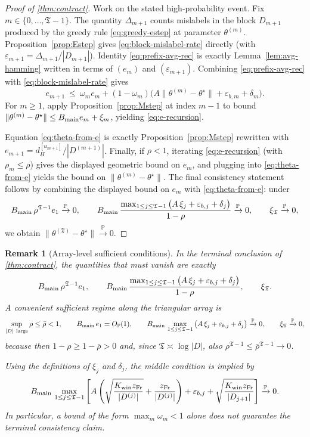 \documentclass{statsoc}
\newtheorem{remark}[remark]{Remark}
\newcommand{\1}{\mathbbm{1}}
\newcommand{\Tmax}{\mathfrak{T}}
\begin{document}
\begin{proof}[Proof of \cref{thm:contract}]
Work on the stated high-probability event. Fix $m\in\{0,\dots,\Tmax-1\}$. The quantity $\Delta_{m+1}$ counts mislabels in the block $D_{m+1}$ produced by the greedy
rule \eqref{eq:greedy-estep} at parameter $\theta^{(m)}$.
Proposition~\ref{prop:Estep} gives \eqref{eq:block-mislabel-rate} directly (with $\varepsilon_{m+1}=\Delta_{m+1}/|D_{m+1}|$). Identity \eqref{eq:prefix-avg-rec} is exactly Lemma~\ref{lem:avg-hamming} written in terms of $(e_m)$ and $(\varepsilon_{m+1})$.
Combining \eqref{eq:prefix-avg-rec} with \eqref{eq:block-mislabel-rate} gives
\[
e_{m+1}\ \le\ \omega_m e_m+(1-\omega_m)\Big(A\|\theta^{(m)}-\theta^\star\|+\varepsilon_{b,m}+\delta_m\Big).
\]
For $m\ge 1$, apply Proposition~\ref{prop:Mstep} at index $m-1$ to bound
$\|\theta^{(m)}-\theta^\star\|\le B_{\rm main}e_m+\xi_m$, yielding \eqref{eq:e-recursion}.

Equation \eqref{eq:theta-from-e} is exactly Proposition~\ref{prop:Mstep} rewritten with $e_{m+1}=d_H^{[u_{m+1}]}/|D^{(m+1)}|$. Finally, if $\rho<1$, iterating \eqref{eq:e-recursion} (with $\rho_m\le\rho$) gives the displayed geometric bound on $e_m$,
and plugging into \eqref{eq:theta-from-e} yields the bound on $\|\theta^{(m)}-\theta^\star\|$.
The final consistency statement follows by combining the displayed bound on \(e_m\) with \eqref{eq:theta-from-e}: under
\[
B_{\rm main}\,\rho^{\Tmax-1} e_1 \xrightarrow{\mathbb P}0,\qquad
B_{\rm main}\,\frac{\max_{1\le j\le \Tmax-1}\big(A\,\xi_j+\varepsilon_{b,j}+\delta_j\big)}{1-\rho}\xrightarrow{\mathbb P}0,\qquad
\xi_{\Tmax}\xrightarrow{\mathbb P}0,
\]
we obtain \(\|\theta^{(\Tmax)}-\theta^\star\|\xrightarrow{\mathbb P}0\).
\end{proof}


\begin{remark}[Array-level sufficient conditions]\label{rem:array-rho}
In the terminal conclusion of \cref{thm:contract}, the quantities that must vanish are exactly
\[
B_{\rm main}\,\rho^{\Tmax-1} e_1,\qquad
B_{\rm main}\,\frac{\max_{1\le j\le \Tmax-1}\big(A\,\xi_j+\varepsilon_{b,j}+\delta_j\big)}{1-\rho},
\qquad
\xi_{\Tmax}.
\]
A convenient sufficient regime along the triangular array is
\[
\sup_{|D|\ \text{large}}\rho\le \bar\rho<1,\qquad
B_{\rm main}\,e_1=O_{\mathbb P}(1),\qquad
B_{\rm main}\,\max_{1\le j\le \Tmax-1}\big(A\,\xi_j+\varepsilon_{b,j}+\delta_j\big)\xrightarrow{\mathbb P}0,\qquad
\xi_{\Tmax}\xrightarrow{\mathbb P}0,
\]
because then \(1-\rho\ge 1-\bar\rho>0\) and, since \(\Tmax\asymp\log|D|\), also
\(\rho^{\Tmax-1}\le \bar\rho^{\Tmax-1}\to 0\).

Using the definitions of \(\xi_j\) and \(\delta_j\), the middle condition is implied by
\[
B_{\rm main}\,\max_{1\le j\le \Tmax-1}\left[
A\left(\sqrt{\frac{K_{\rm win} z_{\rm Fr}}{|D^{(j)}|}}+\frac{z_{\rm Fr}}{|D^{(j)}|}\right)
+\varepsilon_{b,j}
+\sqrt{\frac{K_{\rm win} z_{\rm Fr}}{|D_{j+1}|}}
\right]\xrightarrow{\mathbb P}0.
\]
In particular, a bound of the form \(\max_m \omega_m<1\) alone does not guarantee the terminal consistency claim.
\end{remark}
\end{document}

